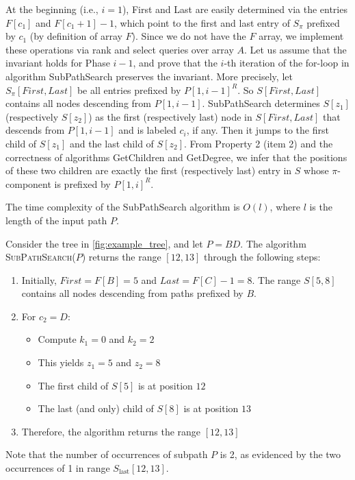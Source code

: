 At the beginning (i.e., $i = 1$), First and Last are easily determined via the entries $F[c_1]$ and $F[c_1 + 1] - 1$, which point to the first and last entry of $S_{\pi}$ prefixed by $c_1$ (by definition of array $F$). Since we do not have the $F$ array, we implement these operations via rank and select queries over array $A$. Let us assume that the invariant holds for Phase $i - 1$, and prove that the $i$-th iteration of the for-loop in algorithm SubPathSearch preserves the invariant. More precisely, let $S_{\pi}[First, Last]$ be all entries prefixed by $P[1, i - 1]^R$. So $S[First, Last]$ contains all nodes descending from $P[1, i - 1]$. SubPathSearch determines $S[z_1]$ (respectively $S[z_2]$) as the first (respectively last) node in $S[First, Last]$ that descends from $P[1, i - 1]$ and is labeled $c_i$, if any. Then it jumps to the first child of $S[z_1]$ and the last child of $S[z_2]$. From Property 2 (item 2) and the correctness of algorithms GetChildren and GetDegree, we infer that the positions of these two children are exactly the first (respectively last) entry in $S$ whose $\pi$-component is prefixed by $P[1, i]^R$. 

The time complexity of the SubPathSearch algorithm is $O(l)$, where $l$ is the length of the input path $P$.

\begin{example}
    Consider the tree in \cref{fig:example_tree}, and let $P = BD$. The algorithm \textsc{SubPathSearch}($P$) returns the range $[12, 13]$ through the following steps:

    \begin{enumerate}
        \item Initially, $First = F[B] = 5$ and $Last = F[C] - 1 = 8$. The range $S[5,8]$ contains all nodes descending from paths prefixed by $B$.
        
        \item For $c_2 = D$:
        \begin{itemize}
            \item Compute $k_1 = 0$ and $k_2 = 2$
            \item This yields $z_1 = 5$ and $z_2 = 8$
            \item The first child of $S[5]$ is at position $12$
            \item The last (and only) child of $S[8]$ is at position $13$
        \end{itemize}
        
        \item Therefore, the algorithm returns the range $[12,13]$
    \end{enumerate}

    Note that the number of occurrences of subpath $P$ is 2, as evidenced by the two occurrences of 1 in range $S_{\text{last}}[12,13]$.
\end{example}

